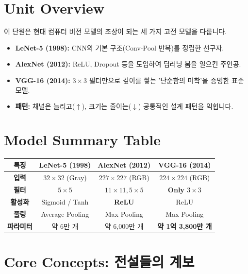\documentclass[11pt,a4paper]{book}
\theoremstyle{definition}
\begin{document}
\section{Unit Overview}
\begin{summarybox}[title={핵심 목표}]
이 단원은 현대 컴퓨터 비전 모델의 조상이 되는 세 가지 고전 모델을 다룹니다.
\begin{itemize}
    \item \textbf{LeNet-5 (1998):} CNN의 기본 구조(Conv-Pool 반복)를 정립한 선구자.
    \item \textbf{AlexNet (2012):} ReLU, Dropout 등을 도입하여 딥러닝 붐을 일으킨 주인공.
    \item \textbf{VGG-16 (2014):} $3 \times 3$ 필터만으로 깊이를 쌓는 '단순함의 미학'을 증명한 표준 모델.
    \item \textbf{패턴:} 채널은 늘리고($\uparrow$), 크기는 줄이는($\downarrow$) 공통적인 설계 패턴을 익힙니다.
\end{itemize}
\end{summarybox}

\section{Model Summary Table}
\begin{center}
\begin{tabular}{|c|c|c|c|}
\hline
\textbf{특징} & \textbf{LeNet-5 (1998)} & \textbf{AlexNet (2012)} & \textbf{VGG-16 (2014)} \\ \hline
\textbf{입력} & $32 \times 32$ (Gray) & $227 \times 227$ (RGB) & $224 \times 224$ (RGB) \\ \hline
\textbf{필터} & $5 \times 5$ & $11 \times 11, 5 \times 5$ & \textbf{Only $3 \times 3$} \\ \hline
\textbf{활성화} & Sigmoid / Tanh & \textbf{ReLU} & ReLU \\ \hline
\textbf{풀링} & Average Pooling & Max Pooling & Max Pooling \\ \hline
\textbf{파라미터} & 약 6만 개 & 약 6,000만 개 & \textbf{약 1억 3,800만 개} \\ \hline
\end{tabular}
\end{center}

\section{Core Concepts: 전설들의 계보}
\end{document}
